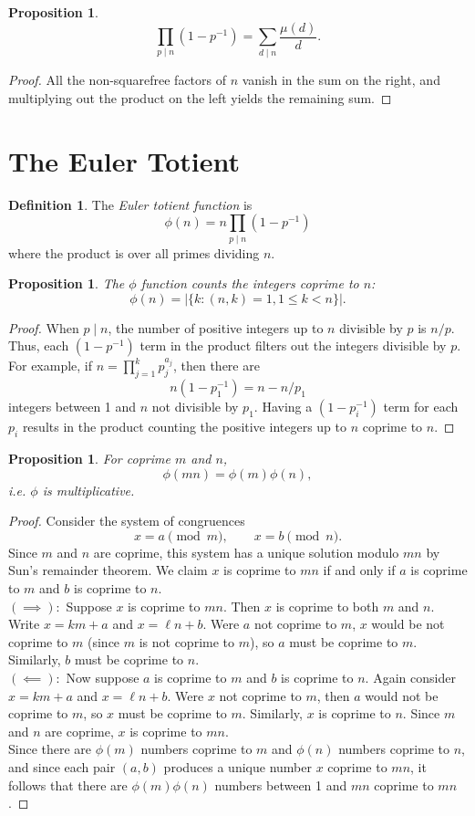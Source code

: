 \documentclass{amsbook}
\numberwithin{section}{chapter}
\theoremstyle{plain}
\newtheorem{prop}[thm]{Proposition}
\theoremstyle{definition}
\newtheorem{defn}[thm]{Definition}
\def\br{~\\[1em]}
\begin{document}
\begin{prop}
\[\prod_{p\mid n}(1 - p^{-1}) = \sum_{d\mid n}\frac{\mu(d)}{d}.\]
\end{prop}
\begin{proof}
All the non-squarefree factors of $n$ vanish in the sum on the
right, and multiplying out the product on the left yields 
the remaining sum.
\end{proof}
\section{The Euler Totient}
\begin{defn}
The \textit{Euler totient function} is
\[\phi(n) = n\prod_{p\mid n}(1 - p^{-1})\]
where the product is over all primes dividing $n$.
\end{defn}
\begin{prop}
The $\phi$ function counts the integers coprime to $n$:
\[\phi(n) = |\{k: (n, k) = 1, 1\le k < n\}|.\]
\end{prop}
\begin{proof}
When $p\mid n$, the number of positive integers up to $n$
divisible by $p$ is $n/p$.
Thus, each $(1 - p^{-1})$ term in the product filters out the integers
divisible by $p$. For example, if $n = \prod_{j = 1}^kp_j^{a_j}$,
then there are
\[n(1 - p_1^{-1}) = n - n/p_1\]
integers between 1 and $n$ not divisible by $p_1$. Having
a $(1 - p_i^{-1})$ term for each $p_i$ results in the product
counting
the positive integers up to $n$ coprime to $n$.
\end{proof}
\begin{prop}
For coprime $m$ and $n$,
\[\phi(mn) = \phi(m)\phi(n),\]
i.e. $\phi$ is multiplicative.
\end{prop}
\begin{proof}
Consider the system of congruences
\[x = a\pmod m,\qquad x = b\pmod n.\]
Since $m$ and $n$ are coprime, this system has a unique solution
modulo $mn$ by Sun's remainder theorem.
We claim $x$ is coprime to $mn$ if and only if $a$ is coprime to $m$
and $b$ is coprime to $n$.
\br
$(\implies):$
Suppose $x$ is coprime to $mn$.
Then $x$ is coprime to both $m$ and $n$.
Write $x = km + a$ and $x = \ell n + b$.
Were $a$ not coprime to $m$, $x$ would be not coprime to $m$
(since $m$ is not coprime to $m$), so $a$ must be coprime to $m$.
Similarly, $b$ must be coprime to $n$.
\br
$(\impliedby):$
Now suppose $a$ is coprime to
$m$ and $b$ is coprime to $n$.
Again consider $x = km + a$ and $x = \ell n + b$. Were $x$ not
coprime to $m$, then $a$ would not be coprime to $m$, so $x$ must
be coprime to $m$. Similarly, $x$ is coprime to $n$. Since $m$ and $n$
are coprime, $x$ is coprime to $mn$.
\br
Since there are $\phi(m)$ numbers coprime to $m$ and $\phi(n)$ numbers
coprime to $n$, and since
each pair $(a, b)$ produces a unique number $x$
coprime to $mn$, it follows that there are $\phi(m)\phi(n)$
numbers between 1 and $mn$ coprime to $mn$.
\end{proof}
\end{document}
